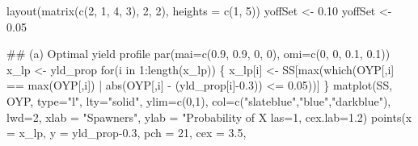 \documentclass[11pt,]{article}
\newenvironment{Shaded}{}{}
\newcommand{\CommentTok}[1]{\textcolor[rgb]{0.00,0.50,0.00}{#1}}
\newcommand{\ControlFlowTok}[1]{\textcolor[rgb]{0.00,0.00,1.00}{#1}}
\newcommand{\DataTypeTok}[1]{#1}
\newcommand{\DecValTok}[1]{#1}
\newcommand{\FloatTok}[1]{#1}
\newcommand{\KeywordTok}[1]{\textcolor[rgb]{0.00,0.00,1.00}{#1}}
\newcommand{\NormalTok}[1]{#1}
\newcommand{\OperatorTok}[1]{#1}
\newcommand{\StringTok}[1]{\textcolor[rgb]{0.00,0.50,0.50}{#1}}
\begin{document}
\begin{Shaded}
\begin{Highlighting}[]
\KeywordTok{layout}\NormalTok{(}\KeywordTok{matrix}\NormalTok{(}\KeywordTok{c}\NormalTok{(}\DecValTok{2}\NormalTok{, }\DecValTok{1}\NormalTok{, }\DecValTok{4}\NormalTok{, }\DecValTok{3}\NormalTok{), }\DecValTok{2}\NormalTok{, }\DecValTok{2}\NormalTok{), }\DataTypeTok{heights =} \KeywordTok{c}\NormalTok{(}\DecValTok{1}\NormalTok{, }\DecValTok{5}\NormalTok{))}
\NormalTok{yoffSet <-}\StringTok{ }\FloatTok{0.10}
\NormalTok{yoffSet <-}\StringTok{ }\FloatTok{0.05}

\CommentTok{## (a) Optimal yield profile}
\KeywordTok{par}\NormalTok{(}\DataTypeTok{mai=}\KeywordTok{c}\NormalTok{(}\FloatTok{0.9}\NormalTok{, }\FloatTok{0.9}\NormalTok{, }\DecValTok{0}\NormalTok{, }\DecValTok{0}\NormalTok{), }\DataTypeTok{omi=}\KeywordTok{c}\NormalTok{(}\DecValTok{0}\NormalTok{, }\DecValTok{0}\NormalTok{, }\FloatTok{0.1}\NormalTok{, }\FloatTok{0.1}\NormalTok{))}
\NormalTok{x_lp <-}\StringTok{ }\NormalTok{yld_prop}
\ControlFlowTok{for}\NormalTok{(i }\ControlFlowTok{in} \DecValTok{1}\OperatorTok{:}\KeywordTok{length}\NormalTok{(x_lp)) \{}
\NormalTok{    x_lp[i] <-}\StringTok{ }\NormalTok{SS[}\KeywordTok{max}\NormalTok{(}\KeywordTok{which}\NormalTok{(OYP[,i] }\OperatorTok{==}\StringTok{ }\KeywordTok{max}\NormalTok{(OYP[,i])}
                            \OperatorTok{|}\StringTok{ }\KeywordTok{abs}\NormalTok{(OYP[,i] }\OperatorTok{-}\StringTok{ }\NormalTok{(yld_prop[i]}\OperatorTok{-}\FloatTok{0.3}\NormalTok{)) }\OperatorTok{<=}\StringTok{ }\FloatTok{0.05}\NormalTok{))]}
\NormalTok{\}}
\KeywordTok{matplot}\NormalTok{(SS, OYP, }\DataTypeTok{type=}\StringTok{"l"}\NormalTok{, }\DataTypeTok{lty=}\StringTok{"solid"}\NormalTok{,  }\DataTypeTok{ylim=}\KeywordTok{c}\NormalTok{(}\DecValTok{0}\NormalTok{,}\DecValTok{1}\NormalTok{),}
        \DataTypeTok{col=}\KeywordTok{c}\NormalTok{(}\StringTok{"slateblue"}\NormalTok{,}\StringTok{"blue"}\NormalTok{,}\StringTok{"darkblue"}\NormalTok{), }\DataTypeTok{lwd=}\DecValTok{2}\NormalTok{,}
        \DataTypeTok{xlab =} \StringTok{"Spawners"}\NormalTok{, }\DataTypeTok{ylab =} \StringTok{"Probability of X%
        \DataTypeTok{las=}\DecValTok{1}\NormalTok{, }\DataTypeTok{cex.lab=}\FloatTok{1.2}\NormalTok{)}
\KeywordTok{points}\NormalTok{(}\DataTypeTok{x =}\NormalTok{ x_lp, }\DataTypeTok{y =}\NormalTok{ yld_prop}\FloatTok{-0.3}\NormalTok{,}
       \DataTypeTok{pch =} \DecValTok{21}\NormalTok{, }\DataTypeTok{cex =} \FloatTok{3.5}\NormalTok{,}
}
\end{Highlighting}
\end{Shaded}
\end{document}
